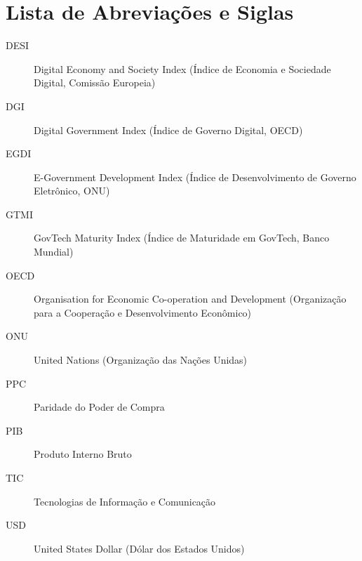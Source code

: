 \chapter*{Lista de Abreviações e Siglas}

\begin{description}
    \item[DESI] Digital Economy and Society Index (Índice de Economia e Sociedade Digital, Comissão Europeia)
    \item[DGI] Digital Government Index (Índice de Governo Digital, OECD)
    \item[EGDI] E-Government Development Index (Índice de Desenvolvimento de Governo Eletrônico, ONU)
    \item[GTMI] GovTech Maturity Index (Índice de Maturidade em GovTech, Banco Mundial)
    \item[OECD] Organisation for Economic Co-operation and Development (Organização para a Cooperação e Desenvolvimento Econômico)
    \item[ONU] United Nations (Organização das Nações Unidas)
    \item[PPC] Paridade do Poder de Compra
    \item[PIB] Produto Interno Bruto
    \item[TIC] Tecnologias de Informação e Comunicação
    \item[USD] United States Dollar (Dólar dos Estados Unidos)
\end{description}